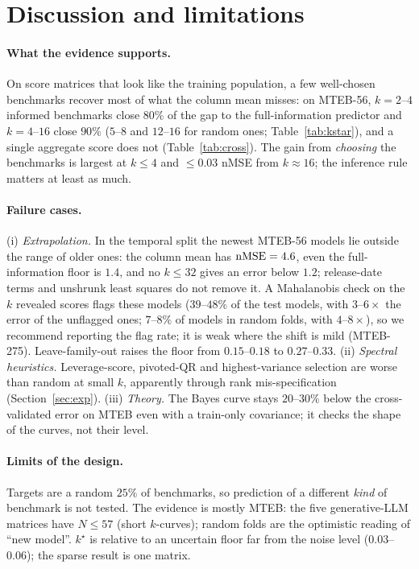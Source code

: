 \section{Discussion and limitations}
\label{sec:disc}
\paragraph{What the evidence supports.}
On score matrices that look like the training population, a few well-chosen benchmarks recover most of what the column mean misses: on MTEB-56, $k=2$--$4$ informed benchmarks close $80\%$ of the gap to the full-information predictor and $k=4$--$16$ close $90\%$ ($5$--$8$ and $12$--$16$ for random ones; Table~\ref{tab:kstar}), and a single aggregate score does not (Table~\ref{tab:cross}). The gain from \emph{choosing} the benchmarks is largest at $k\le4$ and $\le0.03$ nMSE from $k\approx16$; the inference rule matters at least as much.

\paragraph{Failure cases.}
(i) \emph{Extrapolation.} In the temporal split the newest MTEB-56 models lie outside the range of older ones: the column mean has $\mathrm{nMSE}=4.6$, even the full-information floor is $1.4$, and no $k\le32$ gives an error below $1.2$; release-date terms and unshrunk least squares do not remove it. A Mahalanobis check on the $k$ revealed scores flags these models ($39$--$48\%$ of the test models, with $3$--$6\times$ the error of the unflagged ones; $7$--$8\%$ of models in random folds, with $4$--$8\times$), so we recommend reporting the flag rate; it is weak where the shift is mild (MTEB-275). Leave-family-out raises the floor from $0.15$--$0.18$ to $0.27$--$0.33$. (ii) \emph{Spectral heuristics.} Leverage-score, pivoted-QR and highest-variance selection are worse than random at small $k$, apparently through rank mis-specification (Section~\ref{sec:exp}). (iii) \emph{Theory.} The Bayes curve stays $20$--$30\%$ below the cross-validated error on MTEB even with a train-only covariance; it checks the shape of the curves, not their level.

\paragraph{Limits of the design.}
Targets are a random $25\%$ of benchmarks, so prediction of a different \emph{kind} of benchmark is not tested. The evidence is mostly MTEB: the five generative-LLM matrices have $N\le57$ (short $k$-curves); random folds are the optimistic reading of ``new model''. $k^\star$ is relative to an uncertain floor far from the noise level ($0.03$--$0.06$); the sparse result is one matrix.
